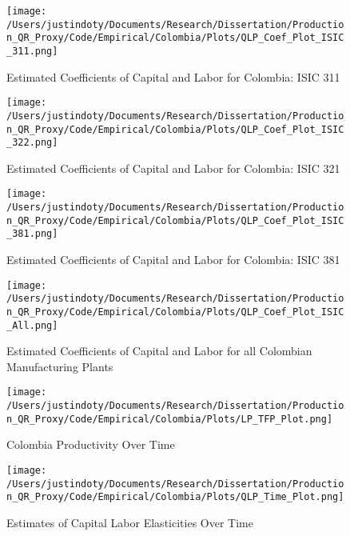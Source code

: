 \documentclass[11pt]{article}
\begin{document}
\begin{figure}[H]
\centering
\caption{Estimated Coefficients of Capital and Labor for Colombia: ISIC 311}
\texttt{[image: /Users/justindoty/Documents/Research/Dissertation/Production\_QR\_Proxy/Code/Empirical/Colombia/Plots/QLP\_Coef\_Plot\_ISIC\_311.png]}
\label{fig:LPCOL311}
\end{figure}

\begin{figure}[H]
\centering
\caption{Estimated Coefficients of Capital and Labor for Colombia: ISIC 321}
\texttt{[image: /Users/justindoty/Documents/Research/Dissertation/Production\_QR\_Proxy/Code/Empirical/Colombia/Plots/QLP\_Coef\_Plot\_ISIC\_322.png]}
\label{fig:LPCOL321}
\end{figure}

\begin{figure}[H]
\centering
\caption{Estimated Coefficients of Capital and Labor for Colombia: ISIC 381}
\texttt{[image: /Users/justindoty/Documents/Research/Dissertation/Production\_QR\_Proxy/Code/Empirical/Colombia/Plots/QLP\_Coef\_Plot\_ISIC\_381.png]}
\label{fig:LPCOL381}
\end{figure}

\begin{figure}[H]
\centering
\caption{Estimated Coefficients of Capital and Labor for all Colombian Manufacturing Plants}
\texttt{[image: /Users/justindoty/Documents/Research/Dissertation/Production\_QR\_Proxy/Code/Empirical/Colombia/Plots/QLP\_Coef\_Plot\_ISIC\_All.png]}
\label{fig:LPCOLall}
\end{figure}

\begin{figure}[H]
\centering
\caption{Colombia Productivity Over Time}
\texttt{[image: /Users/justindoty/Documents/Research/Dissertation/Production\_QR\_Proxy/Code/Empirical/Colombia/Plots/LP\_TFP\_Plot.png]}
\label{fig:LPCOLpgrowth}
\end{figure}

\begin{figure}[H]
\centering
\caption{Estimates of Capital Labor Elasticities Over Time}
\texttt{[image: /Users/justindoty/Documents/Research/Dissertation/Production\_QR\_Proxy/Code/Empirical/Colombia/Plots/QLP\_Time\_Plot.png]}
\label{fig:LPCOLtimecoef}
\end{figure}
\end{document}
